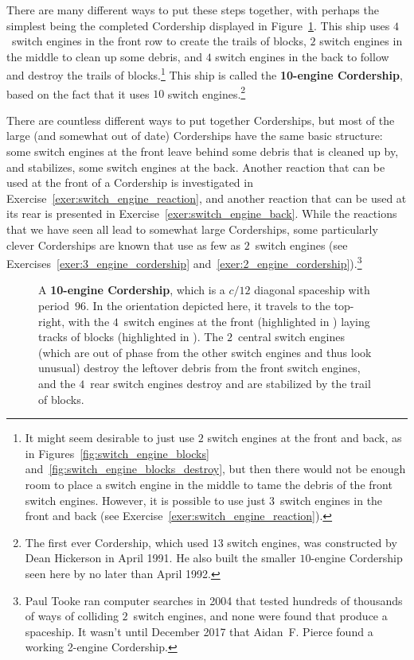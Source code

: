 There are many different ways to put these steps together, with perhaps the simplest being the completed Cordership displayed in Figure~\ref{fig:10_engine_cordership}. This ship uses $4$~switch engines in the front row to create the trails of blocks, $2$ switch engines in the middle to clean up some debris, and $4$ switch engines in the back to follow and destroy the trails of blocks.\footnote{It might seem desirable to just use $2$ switch engines at the front and back, as in Figures~\ref{fig:switch_engine_blocks} and~\ref{fig:switch_engine_blocks_destroy}, but then there would not be enough room to place a switch engine in the middle to tame the debris of the front switch engines. However, it is possible to use just $3$~switch engines in the front and back (see Exercise~\ref{exer:switch_engine_reaction}).} This ship is called the \textbf{10-engine Cordership}, based on the fact that it uses $10$ switch engines.\footnote{The first ever Cordership, which used $13$ switch engines, was constructed by Dean Hickerson in April 1991. He also built the smaller $10$-engine Cordership seen here by no later than April 1992.}

There are countless different ways to put together Corderships, but most of the large (and somewhat out of date) Corderships have the same basic structure: some switch engines at the front leave behind some debris that is cleaned up by, and stabilizes, some switch engines at the back. Another reaction that can be used at the front of a Cordership is investigated in Exercise~\ref{exer:switch_engine_reaction}, and another reaction that can be used at its rear is presented in Exercise~\ref{exer:switch_engine_back}. While the reactions that we have seen all lead to somewhat large Corderships, some particularly clever Corderships are known that use as few as $2$~switch engines (see Exercises~\ref{exer:3_engine_cordership} and~\ref{exer:2_engine_cordership}).\footnote{Paul Tooke ran computer searches in 2004 that tested hundreds of thousands of ways of colliding $2$~switch engines, and none were found that produce a spaceship. It wasn't until December 2017 that Aidan~F. Pierce found a working 2-engine Cordership.}

\begin{figure}[!htb]
	\centering{}
	\caption{A \textbf{10-engine Cordership}, which is a $c/12$ diagonal spaceship with period~$96$. In the orientation depicted here, it travels to the top-right, with the $4$~switch engines at the front (highlighted in ) laying tracks of blocks (highlighted in ). The $2$~central switch engines (which are out of phase from the other switch engines and thus look unusual) destroy the leftover debris from the front switch engines, and the $4$~rear switch engines destroy and are stabilized by the trail of blocks.}\label{fig:10_engine_cordership}
\end{figure}


